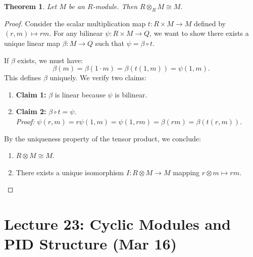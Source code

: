 \documentclass[a4paper,12pt]{article}
\newtheorem{thm}{Theorem}[section]
\begin{document}
\begin{thm}
    Let $M$ be an $R$-module. Then $R \otimes_R M \cong M$.
\end{thm}
\begin{proof}
    Consider the scalar multiplication map $t: R \times M \to M$ defined by $(r,m) \mapsto rm$. 
    For any bilinear $\psi: R \times M \to Q$, we want to show there exists a unique linear map $\beta: M \to Q$ such that $\psi = \beta \circ t$. 
    
    \begin{center}
    \end{center}
    If $\beta$ exists, we must have:
    \[ \beta(m) = \beta(1 \cdot m) = \beta(t(1,m)) = \psi(1,m). \]
    This defines $\beta$ uniquely. We verify two claims:
    \begin{enumerate}
        \item \textbf{Claim 1:} $\beta$ is linear because $\psi$ is bilinear.
        \item \textbf{Claim 2:} $\beta \circ t = \psi$. 
        \\ \textit{Proof:} $\psi(r,m) = r\psi(1,m) = \psi(1,rm) = \beta(rm) = \beta(t(r,m))$.
    \end{enumerate}
    By the uniqueness property of the tensor product, we conclude:
    \begin{enumerate}
        \item $R \otimes M \cong M$.
        \item There exists a unique isomorphism $I: R \otimes M \to M$ mapping $r \otimes m \mapsto rm$.
    \end{enumerate}
\end{proof}
\newpage
\section{Lecture 23: Cyclic Modules and PID Structure (Mar 16)}
\end{document}
